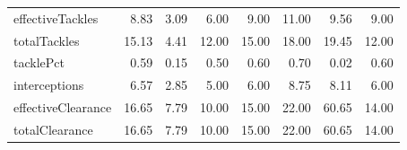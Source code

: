 \begin{table}[H]
\begin{tabular}{lrrrrrrr}
effectiveTackles & 8.83 & 3.09 & 6.00 & 9.00 & 11.00 & 9.56 & 9.00 \\
totalTackles & 15.13 & 4.41 & 12.00 & 15.00 & 18.00 & 19.45 & 12.00 \\
tacklePct & 0.59 & 0.15 & 0.50 & 0.60 & 0.70 & 0.02 & 0.60 \\
interceptions & 6.57 & 2.85 & 5.00 & 6.00 & 8.75 & 8.11 & 6.00 \\
effectiveClearance & 16.65 & 7.79 & 10.00 & 15.00 & 22.00 & 60.65 & 14.00 \\
totalClearance & 16.65 & 7.79 & 10.00 & 15.00 & 22.00 & 60.65 & 14.00 \\
\hline
\end{tabular}
\end{table}
